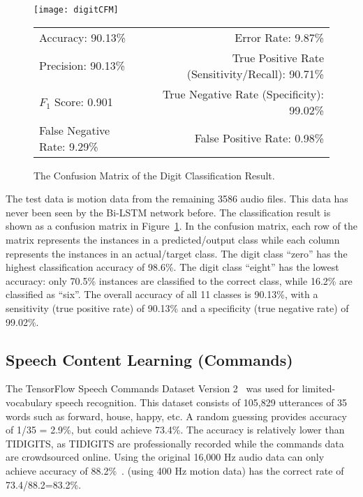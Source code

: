 \begin{figure}[!h]
	\centering
	\texttt{[image: digitCFM]}
	\centering
		\begin{tabular}{lr}
		\toprule
		Accuracy: 90.13\% & \hspace{-.55in} Error Rate: 9.87\% \\
		Precision: 90.13\% & \hspace{-.55in} True Positive Rate (Sensitivity/Recall): 90.71\% \\
		$F_1$ Score: 0.901 & \hspace{-.55in} True Negative Rate (Specificity): 99.02\% \\
		False Negative Rate: 9.29\% & \hspace{-.55in} False Positive Rate: 0.98\% \\
		\bottomrule
	\end{tabular}

	\caption{The Confusion Matrix of the Digit Classification Result.}
	\label{fig:digitCFM}
\end{figure}
%
The test data is motion data from the remaining 3586 audio files. This data has never been seen by the Bi-LSTM network before. The classification result is shown as a confusion matrix in Figure~\ref{fig:digitCFM}. In the confusion matrix, each row of the matrix represents the instances in a predicted/output class while each column represents the instances in an actual/target class. The digit class ``zero'' has the highest classification accuracy of 98.6\%. The digit class ``eight'' has the lowest accuracy: only 70.5\% instances are classified to the correct class, while 16.2\% are classified as ``six''.
The overall accuracy of all 11 classes is 90.13\%, with a sensitivity (true positive rate) of 90.13\% and a specificity (true negative rate) of 99.02\%.


\subsection{Speech Content Learning (Commands)}\label{sec:word}
The TensorFlow Speech Commands Dataset Version 2~\cite{warden2018speech} was used for limited-vocabulary speech recognition. This dataset consists of 105,829 utterances of 35 words such as forward, house, happy, etc. A random guessing provides accuracy of 1/35 = 2.9\%, but {\systemName} could achieve 73.4\%. The accuracy is relatively lower than TIDIGITS, as TIDIGITS are professionally recorded while the commands data are crowdsourced online. Using the original 16,000 Hz audio data can only achieve accuracy of 88.2\%~\cite{warden2018speech}. {\systemName} (using 400 Hz motion data) has the correct rate of 73.4/88.2=83.2\%.

